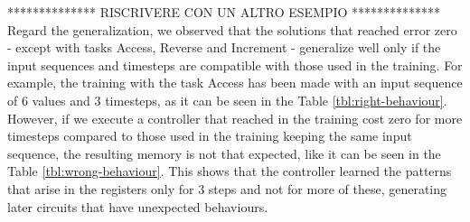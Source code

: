 ************** RISCRIVERE CON UN ALTRO ESEMPIO **************
Regard the generalization, we observed that the solutions that reached error zero - except with tasks Access, Reverse and Increment - generalize well only if the input sequences and timesteps are compatible with those used in the training. For example, the training with the task Access has been made with an input sequence of 6 values and 3 timesteps, as it can be seen in the Table \ref{tbl:right-behaviour}. However, if we execute a controller that reached in the training cost zero for more timesteps compared to those used in the training keeping the same input sequence, the resulting memory is not that expected, like it can be seen in the Table \ref{tbl:wrong-behaviour}. This shows that the controller learned the patterns that arise in the registers only for 3 steps and not for more of these, generating later circuits that have unexpected behaviours.\newline
\begin{table}[t]
	\centering
	\caption{Wrong behaviour obtained with the task Access, executing for 5 timesteps the controller that reached cost zero and trained without Curriculum Learning. The controller continues to access the position of the memory indicated at the index 0.}
	\label{tbl:wrong-behaviour}
\end{table}
\fi


